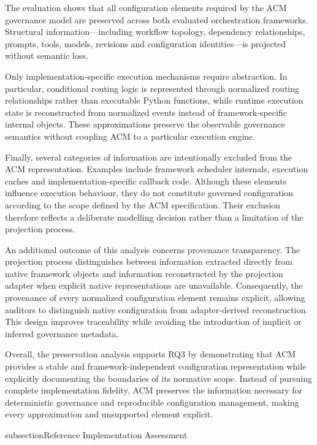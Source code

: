 \documentclass[10pt]{article}
\begin{document}
The evaluation shows that all configuration elements required by the ACM governance model are preserved across both evaluated orchestration frameworks. Structural information—including workflow topology, dependency relationships, prompts, tools, models, revisions and configuration identities—is projected without semantic loss.

Only implementation-specific execution mechanisms require abstraction. In particular, conditional routing logic is represented through normalized routing relationships rather than executable Python functions, while runtime execution state is reconstructed from normalized events instead of framework-specific internal objects. These approximations preserve the observable governance semantics without coupling ACM to a particular execution engine.

Finally, several categories of information are intentionally excluded from the ACM representation. Examples include framework scheduler internals, execution caches and implementation-specific callback code. Although these elements influence execution behaviour, they do not constitute governed configuration according to the scope defined by the ACM specification. Their exclusion therefore reflects a deliberate modelling decision rather than a limitation of the projection process.

An additional outcome of this analysis concerns provenance transparency. The projection process distinguishes between information extracted directly from native framework objects and information reconstructed by the projection adapter when explicit native representations are unavailable. Consequently, the provenance of every normalized configuration element remains explicit, allowing auditors to distinguish native configuration from adapter-derived reconstruction. This design improves traceability while avoiding the introduction of implicit or inferred governance metadata.

Overall, the preservation analysis supports RQ3 by demonstrating that ACM provides a stable and framework-independent configuration representation while explicitly documenting the boundaries of its normative scope. Instead of pursuing complete implementation fidelity, ACM preserves the information necessary for deterministic governance and reproducible configuration management, making every approximation and unsupported element explicit.

subsection{Reference Implementation Assessment}
\label{sec:reference_implementation_assessment}
\end{document}
